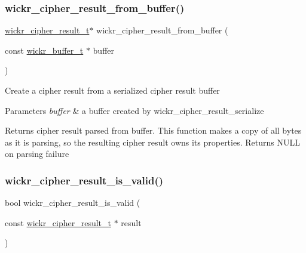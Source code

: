\subsubsection{\texorpdfstring{wickr\+\_\+cipher\+\_\+result\+\_\+from\+\_\+buffer()}{wickr\_cipher\_result\_from\_buffer()}}
{\footnotesize\ttfamily \mbox{\hyperlink{structwickr__cipher__result}{wickr\+\_\+cipher\+\_\+result\+\_\+t}}$\ast$ wickr\+\_\+cipher\+\_\+result\+\_\+from\+\_\+buffer (\begin{DoxyParamCaption}\item[{const \mbox{\hyperlink{structwickr__buffer}{wickr\+\_\+buffer\+\_\+t}} $\ast$}]{buffer }\end{DoxyParamCaption})}

Create a cipher result from a serialized cipher result buffer


\begin{DoxyParams}{Parameters}
{\em buffer} & a buffer created by \textquotesingle{}wickr\+\_\+cipher\+\_\+result\+\_\+serialize\textquotesingle{} \\
\hline
\end{DoxyParams}
\begin{DoxyReturn}{Returns}
cipher result parsed from \textquotesingle{}buffer\textquotesingle{}. This function makes a copy of all bytes as it is parsing, so the resulting cipher result owns its properties. Returns N\+U\+LL on parsing failure 
\end{DoxyReturn}
\mbox{\label{group__wickr__cipher_ga3f1b679c199987148952816b6fc4c009}} 
\subsubsection{\texorpdfstring{wickr\+\_\+cipher\+\_\+result\+\_\+is\+\_\+valid()}{wickr\_cipher\_result\_is\_valid()}}
{\footnotesize\ttfamily bool wickr\+\_\+cipher\+\_\+result\+\_\+is\+\_\+valid (\begin{DoxyParamCaption}\item[{const \mbox{\hyperlink{structwickr__cipher__result}{wickr\+\_\+cipher\+\_\+result\+\_\+t}} $\ast$}]{result }\end{DoxyParamCaption})}

